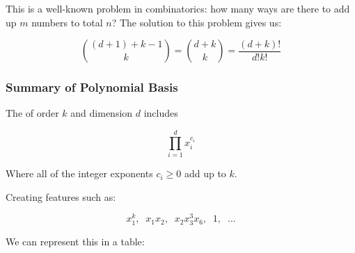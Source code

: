                 This is a well-known problem in combinatorics: how many ways are there to add up $m$ numbers to total $n$? The solution to this problem gives us:

                \begin{equation}
                    \binom{(d+1)+k-1}{k} = \binom{d+k}{k} = \frac{(d+k)!}{d!k!}
                \end{equation}

            \subsecdiv
            \subsubsection*{Summary of Polynomial Basis}

                \phantom{}

                \begin{definition}
                    The  of order $k$ and dimension $d$ includes 

                    \begin{equation}
                        \prod_{i=1}^d x_i^{c_i}
                    \end{equation}

                    Where all of the integer exponents $c_i\geq 0$ add up to  $k$.

                    Creating features such as:

                    \begin{equation}
                        x_1^k, \;\; x_1x_2, \;\; x_2x_3^3x_6, \;\; 1, \;\; \dots
                    \end{equation}
                \end{definition}

                We can represent this in a table:

